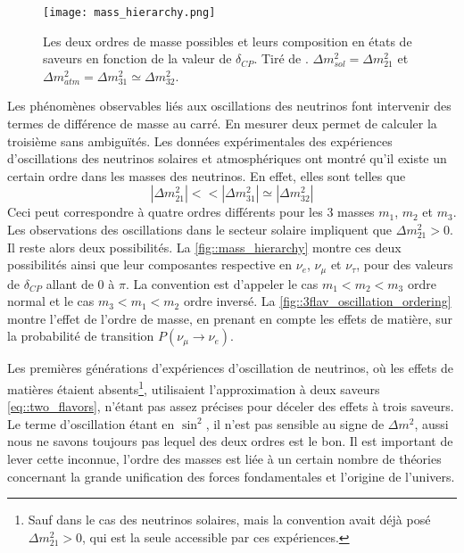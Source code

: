         \begin{figure}[!htb]
          \centering
          \texttt{[image: mass\_hierarchy.png]}
          \caption[Les deux ordres de masse possibles]{\label{fig::mass_hierarchy}Les deux ordres de masse possibles et leurs composition en états de saveurs en fonction de la valeur de $\delta_{CP}$. Tiré de \cite{Qian2015}. $\Delta m^2_{sol}=\Delta m^2_{21}$ et $\Delta m^2_{atm}=\Delta m^2_{31}\simeq\Delta m^2_{32}$.}
        \end{figure}
        Les phénomènes observables liés aux oscillations des neutrinos font intervenir des termes de différence de masse au carré. En mesurer deux permet de calculer la troisième sans ambiguïtés. Les données expérimentales des expériences d'oscillations des neutrinos solaires et atmosphériques ont montré qu'il existe un certain ordre dans les masses des neutrinos. En effet, elles sont telles que
        \begin{equation}\label{eq::mass_hierarchy}
          |\Delta m^2_{21}| <<|\Delta m^2_{31}| \simeq |\Delta m^2_{32}| 
        \end{equation}
        Ceci peut correspondre à quatre ordres différents pour les 3 masses $m_1$, $m_2$ et $m_3$. Les observations des oscillations dans le secteur solaire impliquent que $\Delta m^2_{21} > 0$\cite{pdg2018}. Il reste alors deux possibilités. La \autoref{fig::mass_hierarchy} montre ces deux possibilités ainsi que leur composantes respective en $\nu_e$, $\nu_{\mu}$ et $\nu_{\tau}$, pour des valeurs de $\delta_{CP}$ allant de 0 à $\pi$\cite{Qian2015}. La convention est d'appeler le cas $m_1 < m_2 < m_3$ ordre normal et le cas $m_3 < m_1 < m_2$ ordre inversé. La \autoref{fig::3flav_oscillation_ordering} montre l'effet de l'ordre de masse, en prenant en compte les effets de matière, sur la probabilité de transition $P(\nu_{\mu}\to\nu_e)$.
        
        Les premières générations d'expériences d'oscillation de neutrinos, où les effets de matières étaient absents\footnote{Sauf dans le cas des neutrinos solaires, mais la convention avait déjà posé $\Delta m^2_{21} > 0$, qui est la seule accessible par ces expériences.}, utilisaient l'approximation à deux saveurs \eqref{eq::two_flavors}, n'étant pas assez précises pour déceler des effets à trois saveurs. Le terme d'oscillation étant en $\sin^2$, il n'est pas sensible au signe de $\Delta m^2$, aussi nous ne savons toujours pas lequel des deux ordres est le bon. Il est important de lever cette inconnue, l'ordre des masses est liée à un certain nombre de théories concernant la grande unification des forces fondamentales et l'origine de l'univers\cite{KH-website}.
        

